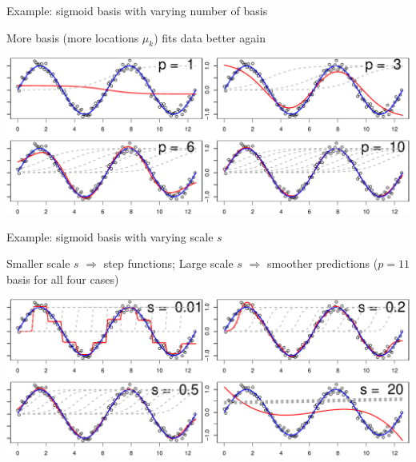 \documentclass[ignorenonframetext,aspectratio=169]{beamer}
\begin{document}
\begin{frame}{Example: sigmoid basis with varying number of basis}
\protect\hypertarget{example-sigmoid-basis-with-varying-number-of-basis}{}

More basis (more locations \(\mu_k\)) fits data better again

\begin{center}\includegraphics[width=1\linewidth]{lecture10_files/figure-beamer/unnamed-chunk-12-1} \end{center}

\end{frame}

\begin{frame}{Example: sigmoid basis with varying scale \(s\)}
\protect\hypertarget{example-sigmoid-basis-with-varying-scale-s}{}

Smaller scale \(s\) \(\Rightarrow\) step functions; Large scale \(s\)
\(\Rightarrow\) smoother predictions (\(p=11\) basis for all four cases)

\begin{center}\includegraphics[width=1\linewidth]{lecture10_files/figure-beamer/unnamed-chunk-13-1} \end{center}

\end{frame}
\end{document}
